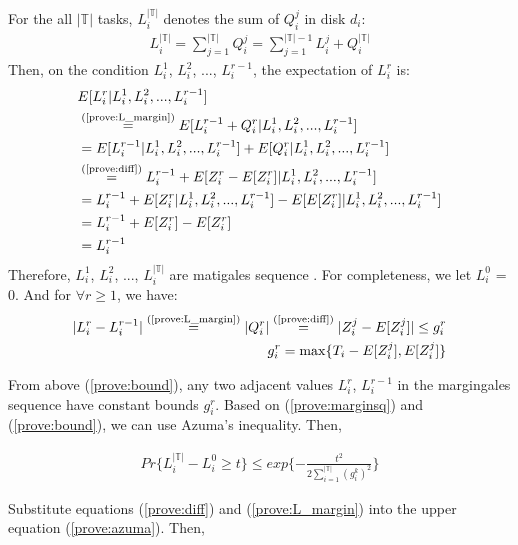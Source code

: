 \documentclass[conference]{IEEEtran}
\begin{document}
For the all $\mathbb{|T|}$ tasks, $L_i^{\mathbb{|T|}}$ denotes the sum of $Q_i^j$ in disk $d_i$:
\begin{align}
L_i^{\mathbb{|T|}} = \sum_{j = 1}^{\mathbb{|T|}} Q_i^j
= \sum_{j = 1}^{\mathbb{|T|} - 1} L_i^j + Q_i^{\mathbb{|T|}} \label{prove:L_margin}
\end{align}
Then, on the condition $L_i^{1}$, $L_i^{2}$, ..., $L_i^{r-1}$, the expectation of $L_i^{r}$ is:
\begin{align}
&E[L_i^{r}|L_i^{1}, L_i^{2}, ..., L_i^{r-1}] \nonumber\\
&\overset{\text{(\ref{prove:L_margin})}}{=}E[L_i^{r-1} + Q_i^{r} |L_i^{1}, L_i^{2}, ..., L_i^{r-1}] \nonumber\\
&\overset{\text{}}{=}E[L_i^{r-1} |L_i^{1}, L_i^{2}, ..., L_i^{r-1}]
+ E[Q_i^{r} |L_i^{1}, L_i^{2}, ..., L_i^{r-1}] \nonumber\\
&\overset{\text{(\ref{prove:diff})}}{=}L_i^{r-1} + E[Z_i^r - E[Z_i^r] |L_i^{1}, L_i^{2}, ..., L_i^{r-1}]\nonumber\\
&=L_i^{r-1} + E[Z_i^r|L_i^{1}, L_i^{2}, ..., L_i^{r-1}]
-E[E[Z_i^r] |L_i^{1}, L_i^{2}, ..., L_i^{r-1}]\nonumber\\
&=L_i^{r-1} + E[Z_i^r] - E[Z_i^r]\nonumber\\
&=L_i^{r-1}\label{prove:marginsq}
\end{align}
Therefore, $L_i^{1}$, $L_i^{2}$, ..., $L_i^{|\mathbb{T}|}$ are matigales sequence \cite{b13}. For completeness, we let $L_i^{0}$ = 0. And for $\forall r \geq 1$, we have:
\begin{align}
  |L_i^r - L_i^{r-1}|\overset{\text{(\ref{prove:L_margin})}}{=} |Q_i^{r}| \overset{\text{(\ref{prove:diff})}}{=} |Z_i^j - E[Z_i^j]|\leq g_i^r\\
  g_i^r = \max\{T_i -  E[Z_i^j], E[Z_i^j]\}\label{prove:bound}
\end{align}

From above (\ref{prove:bound}), any two adjacent values $L_i^r$, $L_i^{r-1}$ in the margingales sequence have constant bounds $g_i^r$. Based on (\ref{prove:marginsq}) and (\ref{prove:bound}), we can use Azuma's inequality. Then, 

\begin{align}
Pr\{L_i^{|\mathbb{T}|} - L_i^{0} \geq t\} \leq exp\{-\frac{t^2}{2\sum_{ i = 1 }^{|\mathbb{T}|}(g_i^k)^2}\} \label{prove:azuma}
\end{align}

Substitute equations (\ref{prove:diff}) and (\ref{prove:L_margin}) into the upper equation (\ref{prove:azuma}). Then, 
\end{document}
